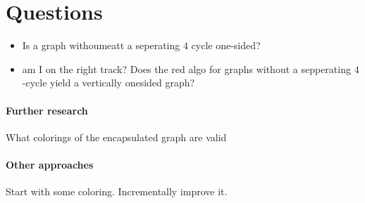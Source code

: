 \documentclass[a4paper]{article}
\theoremstyle{definition}
\begin{document}
\section{Questions}
\begin{itemize}
\item Is a graph withoumeatt a seperating $4$ cycle one-sided?
\item am I on the right track? Does the red algo for graphs without a sepperating $4$-cycle yield a vertically onesided graph?
\end{itemize}

\paragraph{Further research}
What colorings of the encapsulated graph are valid

\paragraph{Other approaches}
Start with some coloring. Incrementally improve it.
\end{document}

